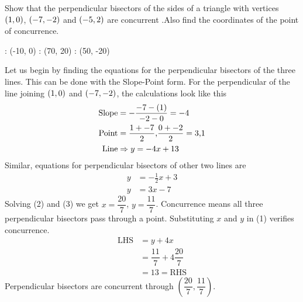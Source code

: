 \question[4] Show that the perpendicular bisectors of the sides of a triangle 
with vertices $(1 , 0 )$, $(-7 , -2)$ and 
$(-5 , 2 )$ are concurrent .Also find the coordinates of the point 
of concurrence.


\watchout

\ifprintanswers
  \begin{marginfigure}
      : (-10, 0)
      : (70, 20)
      : (50, -20)
    \figdrawbegin{}
      \figdrawline [10, 20]
      \figdrawline [20, 30]
      \figdrawline [30, 10]
    \figdrawend
    \centerline{\box\figBoxA}
  \end{marginfigure}
\fi 

\begin{solution}[\fullpage]
  Let us begin by finding the equations for the perpendicular bisectors 
  of the three lines. This can be done with the Slope-Point form.
  For the perpendicular of the line joining $(1, 0)$ and 
  $(-7, -2)$, the calculations look like this  
  \begin{align}
	\text{Slope} &= -\dfrac{-7 - (1)}
	    				   {-2 - 0} = -4  	   \nonumber \\
    \text{Point} &= \dfrac{1+-7}{2}\text{,}
    				\dfrac{0+-2}{2} = 3\text{,}1 \nonumber \\ 
    \text{Line}  &\Rightarrow y = -4x + 13
  \end{align}
  Similar, equations for perpendicular bisectors of other two lines are
  \begin{align}
  	y &= -\frac{1}{2}x + 3 \\
  	y &= 3x - 7
  \end{align}
  Solving (2) and (3) we get $x=\dfrac{20}{7}$, $y=\dfrac{11}{7}$.
  Concurrence means all three perpendicular bisectors pass through a point.
  Substituting $x$ and $y$ in (1) verifies concurrence.
  \begin{align}
  	\text{LHS} &= y + 4x \nonumber \\
  			   &= \dfrac{11}{7} + 4\dfrac{20}{7} \nonumber \\
  			   &= 13 = \text{RHS} \nonumber
  \end{align}
  Perpendicular bisectors are concurrent through 
  $(\dfrac{20}{7}, \dfrac{11}{7})$.
\end{solution}
